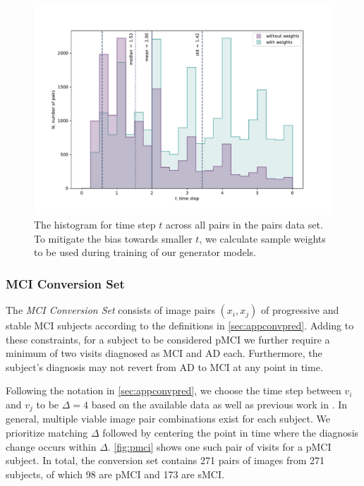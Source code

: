 \begin{figure}[h]
	\centering
	\includegraphics[width=\linewidth]{images/timestep_plots/hist} 
	\caption{The histogram for time step $t$ across all pairs in the pairs data set. To mitigate the bias towards smaller $t$, we calculate sample weights to be used during training of our generator models.}
	\label{fig:timestephist}
\end{figure}


\subsubsection*{MCI Conversion Set} \label{sec:datconv}
The \textit{MCI Conversion Set} consists of image pairs $(x_i, x_j)$ of progressive and stable MCI subjects according to the definitions in \autoref{sec:appconvpred}. Adding to these constraints, for a subject to be considered pMCI we further require a minimum of two visits diagnosed as MCI and AD each. Furthermore, the subject's diagnosis may not revert from AD to MCI at any point in time.

Following the notation in \ref{sec:appconvpred}, we choose the time step between $v_i$ and $v_j$ to be $\Delta = 4$ based on the available data as well as previous work in \cite{wegmayr2019generative}. In general, multiple viable image pair combinations exist for each subject. We prioritize matching $\Delta$ followed by centering the point in time where the diagnosis change occurs within $\Delta$. \autoref{fig:pmci} shows one such pair of visits for a pMCI subject. In total, the conversion set contains 271 pairs of images from 271 subjects, of which 98 are pMCI and 173 are sMCI.

